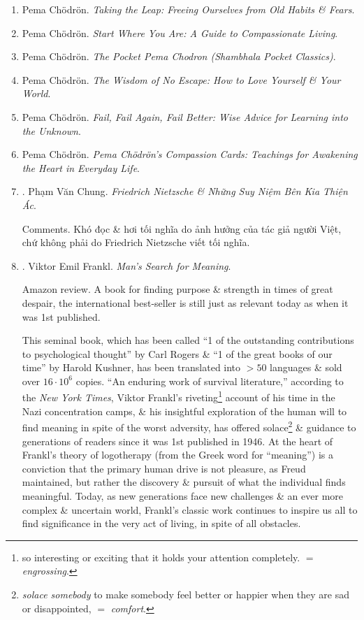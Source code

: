 \documentclass{article}
\begin{document}
\begin{enumerate}
	\item {\sc Pema Ch\"odr\"on}. {\it Taking the Leap: Freeing Ourselves from Old Habits \& Fears}.

	\item {\sc Pema Ch\"odr\"on}. {\it Start Where You Are: A Guide to Compassionate Living}.

	\item {\sc Pema Ch\"odr\"on}. {\it The Pocket Pema Chodron (Shambhala Pocket Classics)}.

	\item {\sc Pema Ch\"odr\"on}. {\it The Wisdom of No Escape: How to Love Yourself \& Your World}.

	\item {\sc Pema Ch\"odr\"on}. {\it Fail, Fail Again, Fail Better: Wise Advice for Learning into the Unknown}.

	\item {\sc Pema Ch\"odr\"on}. {\it{\sc Pema Ch\"odr\"on}'s Compassion Cards: Teachings for Awakening the Heart in Everyday Life}.

	\item \cite{Chung2022}. {\sc Phạm Văn Chung}. {\it Friedrich Nietzsche \& Những Suy Niệm Bên Kia Thiện Ác}.\hfill{\sf[done]}

	{\sf Comments.} Khó đọc \& hơi tối nghĩa do ảnh hưởng của tác giả người Việt, chứ không phải do {\sc Friedrich Nietzsche} viết tối nghĩa.

	\item \cite{Frankl_meaning}. {\sc Viktor Emil Frankl}. {\it Man's Search for Meaning}.\hfill{\sf[reading]}

	{\sf Amazon review.} A book for finding purpose \& strength in times of great despair, the international best-seller is still just as relevant today as when it was 1st published.

	This seminal book, which has been called ``1 of the outstanding contributions to psychological thought'' by {\sc Carl Rogers} \& ``1 of the great books of our time'' by {\sc Harold Kushner}, has been translated into $> 50$ languages \& sold over $16\cdot10^6$ copies. ``An enduring work of survival literature,'' according to the {\it New York Times}, {\sc Viktor Frankl}'s riveting\footnote{so interesting or exciting that it holds your attention completely. $=$ {\it engrossing}.} account of his time in the Nazi concentration camps, \& his insightful exploration of the human will to find meaning in spite of the worst adversity, has offered solace\footnote{{\it solace somebody} to make somebody feel better or happier when they are sad or disappointed, $=$ {\it comfort}.} \& guidance to generations of readers since it was 1st published in 1946. At the heart of {\sc Frankl}'s theory of logotherapy (from the Greek word for ``meaning'') is a conviction that the primary human drive is not pleasure, as {\sc Freud} maintained, but rather the discovery \& pursuit of what the individual finds meaningful. Today, as new generations face new challenges \& an ever more complex \& uncertain world, {\sc Frankl}'s classic work continues to inspire us all to find significance in the very act of living, in spite of all obstacles.


\end{enumerate}
\end{document}
